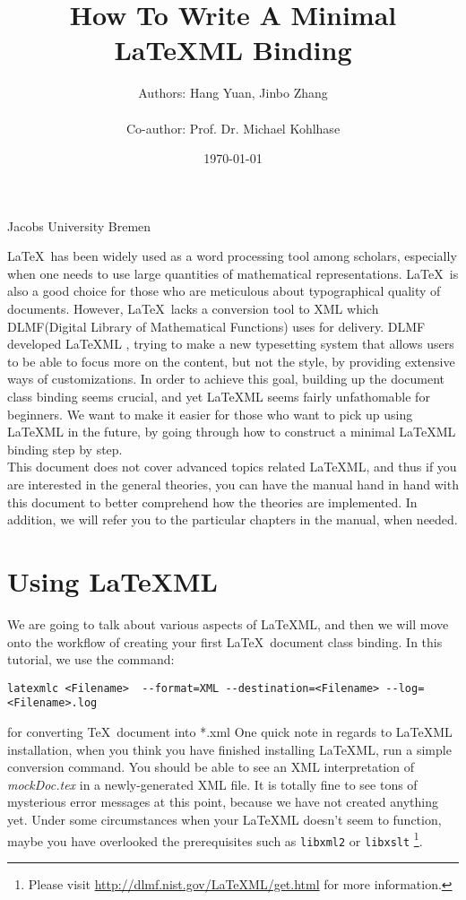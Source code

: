 \documentclass{article}
\title{\textbf{How To Write A Minimal \LaTeX ML Binding}}
\author{Authors: Hang Yuan, Jinbo Zhang \\ \\Co-author: Prof. Dr. Michael Kohlhase}
\date{\today}
\begin{document}
\maketitle
\begin{center}
Jacobs University Bremen
\end{center}
\noindent\LaTeX\ has been widely used as a word processing tool among scholars, especially when one needs to use large quantities of mathematical representations. \LaTeX\ is also a good choice for those who are meticulous about typographical quality of documents. However, \LaTeX\ lacks a conversion tool to XML which DLMF(Digital Library of Mathematical Functions) uses for delivery. DLMF developed \LaTeX ML , trying to make a new typesetting system that allows users to be able to focus more on the content, but not the style, by providing extensive ways of customizations. In order to achieve this goal, building up the document class binding seems crucial, and yet \LaTeX ML seems fairly unfathomable for beginners. We want to make it easier for those who
want to pick up using \LaTeX ML in the future, by going through how to construct a minimal \LaTeX ML binding step by step. \\

\noindent This document does not cover advanced topics related \LaTeX ML, and thus if you are interested in the general theories, you can have the manual hand in hand with this document to better comprehend how the theories are implemented. In addition, we will refer you to the particular chapters in the manual, when needed.

\section{Using LaTeXML}
We are going to talk about various aspects of \LaTeX ML, and then we will move onto the workflow of creating your first \LaTeX\ document class binding. In this tutorial, we use the command:

\begin{lstlisting}
latexmlc <Filename>  --format=XML --destination=<Filename> --log=<Filename>.log
\end{lstlisting}
for converting \TeX\ document into *.xml 
One quick note in regards to \LaTeX ML installation, when you think you have finished installing \LaTeX ML, run a simple conversion command. You should be able to see an XML interpretation of \textit{mockDoc.tex} in a newly-generated XML file. It is totally fine to see tons of mysterious 
error messages at this point, because we have not created anything yet. Under some circumstances when your \LaTeX ML doesn't seem
to function, maybe you have overlooked the prerequisites such as \texttt{libxml2} or \texttt{libxslt} \footnote{Please visit \url{http://dlmf.nist.gov/LaTeXML/get.html} for more information.}. \\
\end{document}
